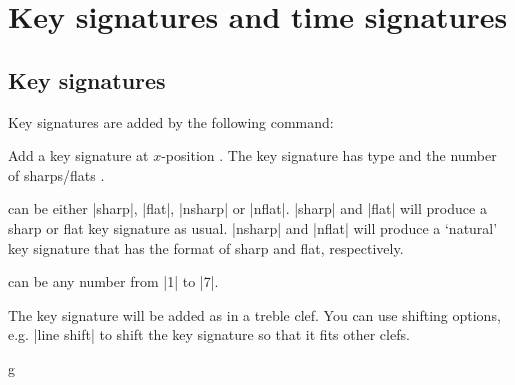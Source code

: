 \section{Key signatures and time signatures}\label{sec:signatures}
\subsection{Key signatures}\label{sec:signatures:key}
Key signatures are added by the following command:
\begin{command}{\tmkeysignature{}}
  Add a key signature at $x$-position . The key signature has type 
   and the number of \mbox{sharps/flats} .

   can be either |sharp|, |flat|, |nsharp| or |nflat|. |sharp| and 
  |flat| will produce a sharp or flat key signature as usual. |nsharp| and 
  |nflat| will produce a `natural' key signature that has the format of sharp and 
  flat, respectively.
  
   can be any number from |1| to |7|.

  The key signature will be added as in a treble clef. You can use shifting options, 
  e.g. |line shift| %
  to shift the key signature so that it fits other clefs.
\end{command}
\begin{codeexample}[]
\begin{tmline}
\begin{tmstaff}{g}{}
\end{tmstaff}
\end{tmline}
\end{codeexample}
